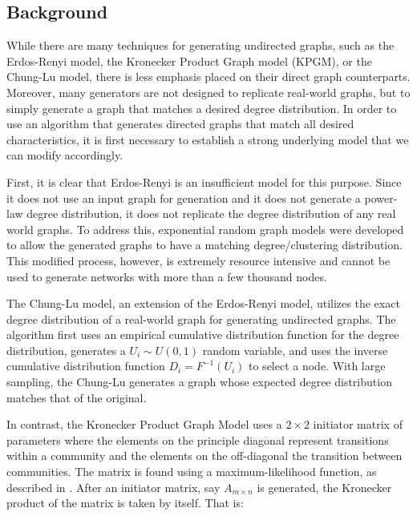 \documentclass[pdftex,11pt,a4paper,twocolumn]{scrartcl}
\begin{document}
\subsection{Background}

While there are many techniques for generating undirected graphs, such as the Erdos-Renyi model, the Kronecker Product Graph model (KPGM), or the Chung-Lu model, there is less emphasis placed on their direct graph counterparts. Moreover, many generators are not designed to replicate real-world graphs, but to simply generate a graph that matches a desired degree distribution. In order to use an algorithm that generates directed graphs that match all desired characteristics, it is first necessary to establish a strong underlying model that we can modify accordingly.

First, it is clear that Erdos-Renyi is an insufficient model for this purpose. Since it does not use an input graph for generation and it does not generate a power-law degree distribution, it does not replicate the degree distribution of any real world graphs. To address this, exponential random graph models were developed to allow the generated graphs to have a matching degree/clustering distribution. This modified process, however, is extremely resource intensive and cannot be used to generate networks with more than a few thousand nodes.


The Chung-Lu model, an extension of the Erdos-Renyi model, utilizes the exact degree distribution of a real-world graph for generating undirected graphs. The algorithm first uses an empirical cumulative distribution function for the degree distribution, generates a $U_i \sim U(0,1)$ random variable, and uses the inverse cumulative distribution function $D_i = F^{-1}(U_i)$ to select a node. With large sampling, the Chung-Lu generates a graph whose expected degree distribution matches that of the original. 

In contrast, the Kronecker Product Graph Model uses a $2\times 2$ initiator matrix of parameters where the elements on the principle diagonal represent transitions within a community and the elements on the off-diagonal the transition between communities. The matrix is found using a maximum-likelihood function, as described in \cite{fgls}. After an initiator matrix, say $A_{m\times n}$ is generated, the Kronecker product of the matrix is taken by itself. That is:
\end{document}
